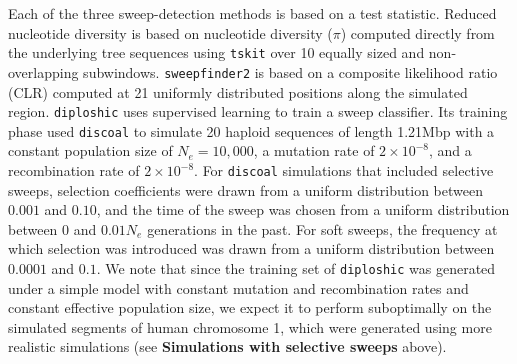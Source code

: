 \documentclass[hidelinks]{article}
\newcommand{\tskit}{\texttt{tskit}\xspace}
\newcommand{\sweepfinder}{\texttt{sweepfinder2}\xspace}
\newcommand{\diploshic}{\texttt{diploshic}\xspace}
\begin{document}
    Each of the three sweep-detection methods is based on a test statistic.
    Reduced nucleotide diversity is based on nucleotide diversity  ($\pi$) 
    computed directly from the underlying tree sequences using \tskit \citep{ralph2020efficiently}
    over 10 equally sized and non-overlapping subwindows.
    \sweepfinder \citep{degiorgio2016sweepfinder2} is based on a composite likelihood ratio (CLR) 
    computed at 21 uniformly distributed positions along the simulated region.
    \diploshic \citep{kern2018diplos} uses supervised learning to train a sweep classifier.
    Its training phase used \texttt{discoal} \citep{kern2016discoal} to simulate 20 haploid sequences of length 1.21Mbp
    with a constant population size of $N_e=10,000$, a mutation rate of $2\times 10^{-8}$, and a recombination rate of $2\times 10^{-8}$.
    For \texttt{discoal} simulations that included selective sweeps,
    selection coefficients were drawn from a uniform distribution between $0.001$ and $0.10$,
    and the time of the sweep was chosen from a uniform distribution between $0$ and $0.01N_e$ generations in the past.
    For soft sweeps, the frequency at which selection was introduced was drawn from a uniform distribution between $0.0001$ and $0.1$.
    We note that since the training set of \diploshic was generated under a simple model with
    constant mutation and recombination rates and constant effective population size,
    we expect it to perform suboptimally on the simulated segments of human chromosome 1,
    which were generated using more realistic simulations (see \textbf{Simulations with selective sweeps} above).
\end{document}
